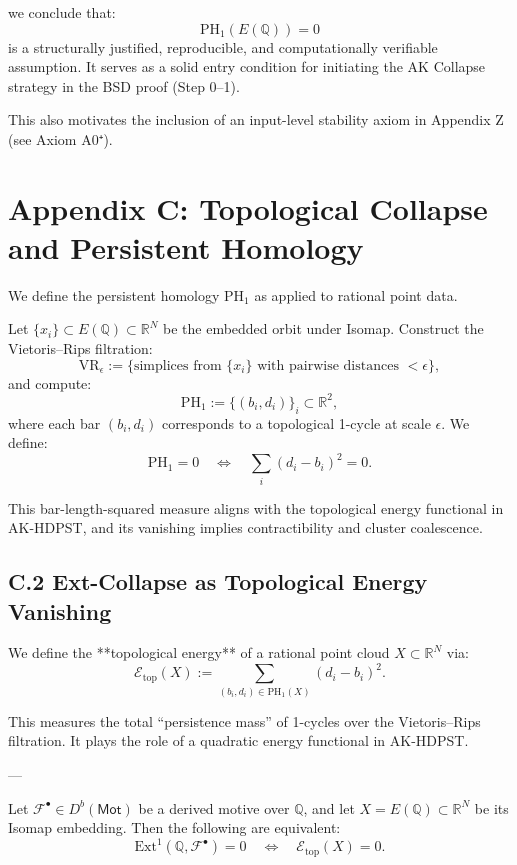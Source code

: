 we conclude that:
\[
\mathrm{PH}_1(E(\mathbb{Q})) = 0
\]
is a structurally justified, reproducible, and computationally verifiable assumption.  
It serves as a solid entry condition for initiating the AK Collapse strategy in the BSD proof (Step 0–1).

This also motivates the inclusion of an input-level stability axiom in Appendix Z (see Axiom A0⁺).



\section*{Appendix C: Topological Collapse and Persistent Homology}

We define the persistent homology \( \mathrm{PH}_1 \) as applied to rational point data.

Let \( \{x_i\} \subset E(\mathbb{Q}) \subset \mathbb{R}^N \) be the embedded orbit under Isomap.  
Construct the Vietoris–Rips filtration:
\[
\mathrm{VR}_\epsilon := \{ \text{simplices from } \{x_i\} \text{ with pairwise distances } < \epsilon \},
\]
and compute:
\[
\mathrm{PH}_1 := \{ (b_i, d_i) \}_{i} \subset \mathbb{R}^2,
\]
where each bar \( (b_i, d_i) \) corresponds to a topological 1-cycle at scale \( \epsilon \).  
We define:
\[
\mathrm{PH}_1 = 0 \quad \Leftrightarrow \quad \sum_i (d_i - b_i)^2 = 0.
\]

This bar-length-squared measure aligns with the topological energy functional in AK-HDPST, and its vanishing implies contractibility and cluster coalescence.

\subsection*{C.2 Ext-Collapse as Topological Energy Vanishing}

We define the **topological energy** of a rational point cloud \( X \subset \mathbb{R}^N \) via:
\[
\mathcal{E}_{\text{top}}(X) := \sum_{(b_i, d_i) \in \mathrm{PH}_1(X)} (d_i - b_i)^2.
\]

This measures the total “persistence mass” of 1-cycles over the Vietoris–Rips filtration.  
It plays the role of a quadratic energy functional in AK-HDPST.

---

\begin{lemma}
Let \( \mathcal{F}^\bullet \in D^b(\mathsf{Mot}) \) be a derived motive over \( \mathbb{Q} \),  
and let \( X = E(\mathbb{Q}) \subset \mathbb{R}^N \) be its Isomap embedding.  
Then the following are equivalent:
\[
\mathrm{Ext}^1(\mathbb{Q}, \mathcal{F}^\bullet) = 0 \quad \Leftrightarrow \quad \mathcal{E}_{\text{top}}(X) = 0.
\]
\end{lemma}

